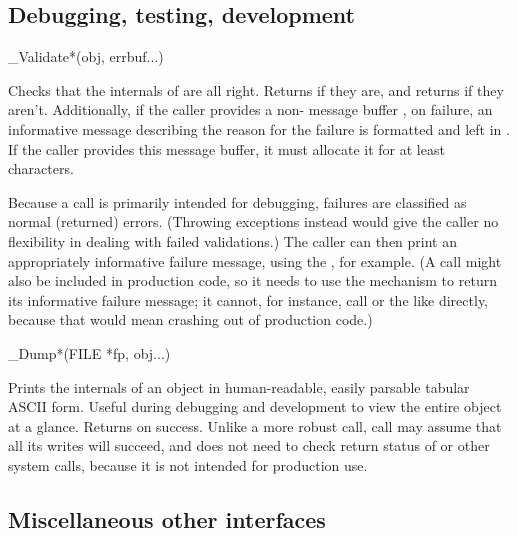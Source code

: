 \subsection{Debugging, testing, development}

\begin{sreapi}
\hypertarget{ifc:Validate}
{\item[\_Validate*(obj, errbuf...)]}

Checks that the internals of  are all right. Returns
 if they are, and returns  if they
aren't. Additionally, if the caller provides a non-
message buffer , on failure, an informative message
describing the reason for the failure is formatted and left in
. If the caller provides this message buffer, it must
allocate it for at least  characters.

Because a  call is primarily intended for
debugging, failures are classified as normal (returned) errors.
(Throwing exceptions instead would give the caller no flexibility in
dealing with failed validations.) The caller can then print an
appropriately informative failure message, using the ,
for example. (A  call might also be included in
production code, so it needs to use the  mechanism to
return its informative failure message; it cannot, for instance, call
 or the like directly, because that would mean
crashing out of production code.)

\hypertarget{ifc:Dump}
{\item[\_Dump*(FILE *fp, obj...)]}

Prints the internals of an object in human-readable, easily parsable
tabular ASCII form. Useful during debugging and development to view
the entire object at a glance. Returns  on success.
Unlike a more robust  call,  call may
assume that all its writes will succeed, and does not need to check
return status of  or other system calls, because it
is not intended for production use.

\end{sreapi}

\subsection{Miscellaneous other interfaces}

